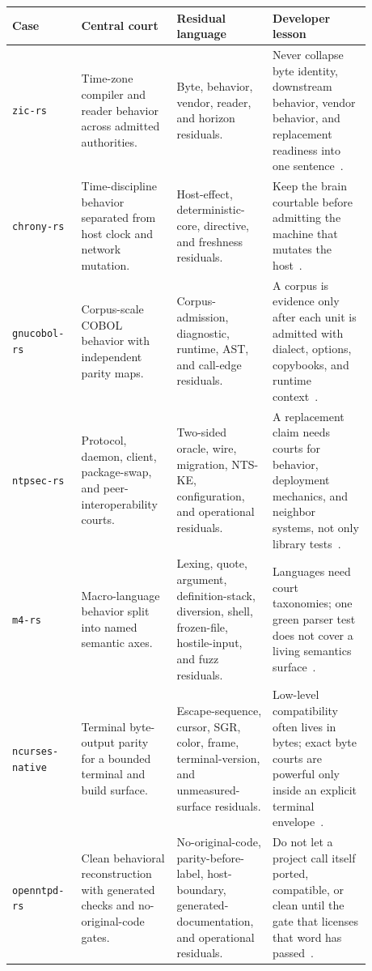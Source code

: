 \documentclass[11pt,a4paper]{article}
\begin{document}
\begingroup
\small
\setlength{\tabcolsep}{3pt}
\begin{longtable}{>{\raggedright\arraybackslash}p{0.17\linewidth}>{\raggedright\arraybackslash}p{0.23\linewidth}>{\raggedright\arraybackslash}p{0.23\linewidth}>{\raggedright\arraybackslash}p{0.25\linewidth}}
\toprule
\textbf{Case} & \textbf{Central court} & \textbf{Residual language} & \textbf{Developer lesson} \\
\midrule
\endhead
\texttt{zic-rs} & Time-zone compiler and reader behavior across admitted authorities. & Byte, behavior, vendor, reader, and horizon residuals. & Never collapse byte identity, downstream behavior, vendor behavior, and replacement readiness into one sentence~\cite{zicrs}. \\
\texttt{chrony-rs} & Time-discipline behavior separated from host clock and network mutation. & Host-effect, deterministic-core, directive, and freshness residuals. & Keep the brain courtable before admitting the machine that mutates the host~\cite{chronyrs}. \\
\texttt{gnucobol-rs} & Corpus-scale COBOL behavior with independent parity maps. & Corpus-admission, diagnostic, runtime, AST, and call-edge residuals. & A corpus is evidence only after each unit is admitted with dialect, options, copybooks, and runtime context~\cite{gnucobolrs}. \\
\texttt{ntpsec-rs} & Protocol, daemon, client, package-swap, and peer-interoperability courts. & Two-sided oracle, wire, migration, NTS-KE, configuration, and operational residuals. & A replacement claim needs courts for behavior, deployment mechanics, and neighbor systems, not only library tests~\cite{ntpsecrs}. \\
\texttt{m4-rs} & Macro-language behavior split into named semantic axes. & Lexing, quote, argument, definition-stack, diversion, shell, frozen-file, hostile-input, and fuzz residuals. & Languages need court taxonomies; one green parser test does not cover a living semantics surface~\cite{m4rs}. \\
\texttt{ncurses-native} & Terminal byte-output parity for a bounded terminal and build surface. & Escape-sequence, cursor, SGR, color, frame, terminal-version, and unmeasured-surface residuals. & Low-level compatibility often lives in bytes; exact byte courts are powerful only inside an explicit terminal envelope~\cite{ncursesnative}. \\
\texttt{openntpd-rs} & Clean behavioral reconstruction with generated checks and no-original-code gates. & No-original-code, parity-before-label, host-boundary, generated-documentation, and operational residuals. & Do not let a project call itself ported, compatible, or clean until the gate that licenses that word has passed~\cite{openntpdrs}. \\
\bottomrule
\end{longtable}
\endgroup
\end{document}
